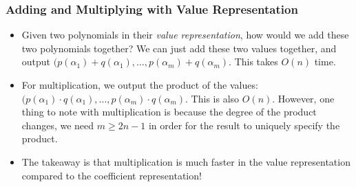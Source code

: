 \subsubsection{Adding and Multiplying with Value Representation}
\begin{itemize}
	\item Given two polynomials in their \textit{value representation}, how would we add these two polynomials together? We can 
		just add these two values together, and output \( (p(\alpha_1) + q(\alpha_1), \dots, p(\alpha_m) + q(\alpha_m) \). This 
		takes \( O(n) \) time. 
	\item For multiplication, we output the product of the values: \( (p(\alpha_1) \cdot q(\alpha_1), \dots, 
		p(\alpha_m) \cdot q(\alpha_m) \). This is also \( O(n) \). However, one thing to note with multiplication is because
		the degree of the product changes, we need \( m \ge 2n-1 \) in order for the result to uniquely specify the product. 
	\item The takeaway is that multiplication is much faster in the value representation compared to the coefficient representation!
\end{itemize}
